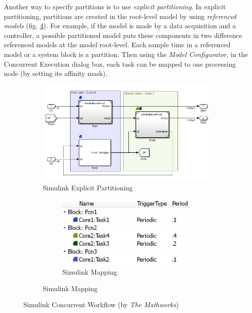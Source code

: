 \par Another way to specify partitions is to use \emph{explicit partitioning}. In explicit partitioning, partitions are created in the root-level model by using \emph{referenced models} (fig. \ref{fig:SimulinkTaskProfiling}). For example, if the model is made by a data acquisition and a controller, a possible partitioned model puts these components in two difference referenced models at the model root-level. Each sample time in a referenced model or a system block is a partition. Then using the \emph{Model Configurator}, in the Concurrent Execution dialog box, each task can be mapped to one processing node (by setting its affinity mask).
\begin{figure}
  \begin{subfigure}{0.65\textwidth}
    \centering
    \includegraphics[width=1\textwidth]{slexMulticorePartitioning}
    \caption{Simulink Explicit Partitioning}
    \label{fig:slexPartitioning}
  \end{subfigure}%
  \begin{subfigure}{0.35\textwidth}
    \begin{subfigure}{\textwidth}
      \centering
      \includegraphics[width=1\textwidth]{slexMulticoreMapping}
      \caption{Simulink Mapping}
      \label{fig:slexMapping}
    \end{subfigure}
  \end{subfigure}
  \caption{Simulink Concurrent Workflow (by \emph{The Mathworks})}
  \label{fig:SimulinkTaskProfiling}
\end{figure}

